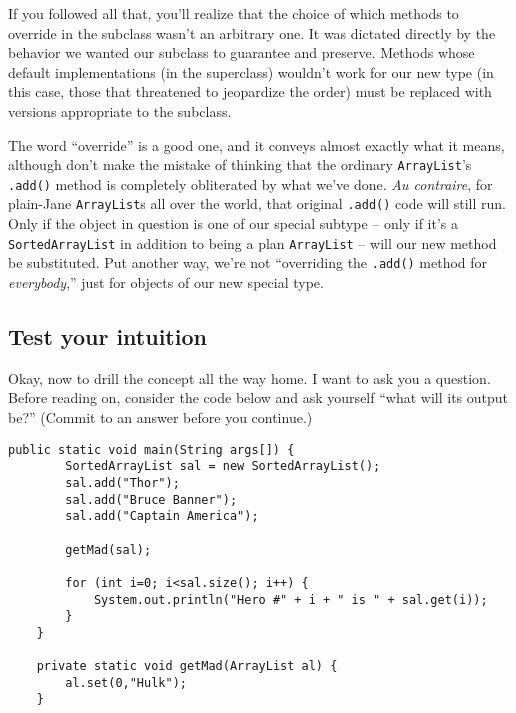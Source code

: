 If you followed all that, you'll realize that the choice of which methods to
override in the subclass wasn't an arbitrary one. It was dictated directly by
the behavior we wanted our subclass to guarantee and preserve. Methods whose
default implementations (in the superclass) wouldn't work for our new type (in
this case, those that threatened to jeopardize the order) must be replaced
with versions appropriate to the subclass.

The word ``override'' is a good one, and it conveys almost exactly what it
means, although don't make the mistake of thinking that the ordinary
\texttt{ArrayList}'s \texttt{.add()} method is completely obliterated by what
we've done. \textit{Au contraire}, for plain-Jane \texttt{ArrayList}s all over
the world, that original \texttt{.add()} code will still run. Only if the
object in question is one of our special subtype -- only if it's a
\texttt{SortedArrayList} in addition to being a plan \texttt{ArrayList} --
will our new method be substituted. Put another way, we're not ``overriding
the \texttt{.add()} method for \textit{everybody},'' just for objects of our
new special type.

\subsection{Test your intuition}

\begin{samepage}
Okay, now to drill the concept all the way home. I want to ask you a question.
Before reading on, consider the code below and ask yourself ``what will its
output be?'' (Commit to an answer before you continue.)

\begin{Verbatim}[fontsize=\small,samepage=true,frame=single]
    public static void main(String args[]) {
        SortedArrayList sal = new SortedArrayList();
        sal.add("Thor");
        sal.add("Bruce Banner");
        sal.add("Captain America");
    
        getMad(sal);
    
        for (int i=0; i<sal.size(); i++) {
            System.out.println("Hero #" + i + " is " + sal.get(i));
        }
    }

    private static void getMad(ArrayList al) {
        al.set(0,"Hulk");
    }
\end{Verbatim}
\end{samepage}

